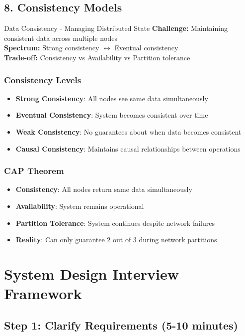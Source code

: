 \documentclass[10pt,a4paper]{article}
\begin{document}
\subsection{8. Consistency Models}

\begin{conceptbox}{Data Consistency - Managing Distributed State}
\textbf{Challenge:} Maintaining consistent data across multiple nodes\\
\textbf{Spectrum:} Strong consistency $\leftrightarrow$ Eventual consistency\\
\textbf{Trade-off:} Consistency vs Availability vs Partition tolerance
\end{conceptbox}

\subsubsection{Consistency Levels}
\begin{itemize}
\item \textbf{Strong Consistency}: All nodes see same data simultaneously
\item \textbf{Eventual Consistency}: System becomes consistent over time
\item \textbf{Weak Consistency}: No guarantees about when data becomes consistent
\item \textbf{Causal Consistency}: Maintains causal relationships between operations
\end{itemize}

\subsubsection{CAP Theorem}
\begin{itemize}
\item \textbf{Consistency}: All nodes return same data simultaneously
\item \textbf{Availability}: System remains operational
\item \textbf{Partition Tolerance}: System continues despite network failures
\item \textbf{Reality}: Can only guarantee 2 out of 3 during network partitions
\end{itemize}

\section{System Design Interview Framework}

\subsection{Step 1: Clarify Requirements (5-10 minutes)}
\end{document}
